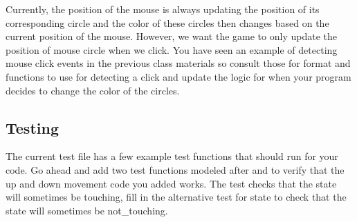 \documentclass{tufte-handout}
\begin{document}
Currently, the position of the mouse is always updating the position of its
corresponding circle and the color of these circles then changes based on
the current position of the mouse. However, we want the game to only update
the position of mouse circle when we click. You have seen an example of
detecting mouse click events in the previous class materials so consult those
for format and functions to use for detecting a click and update the logic for
when your program decides to change the color of the circles.

\subsection{Testing}

The current test file has a few example test functions that should run for
your code. Go ahead and add two test functions modeled after
 and 
to verify that the up and down movement code you added works. The test
 checks that the state will sometimes
be touching, fill in the alternative test for state
 to check that the state will
sometimes be not\_touching.
\end{document}
